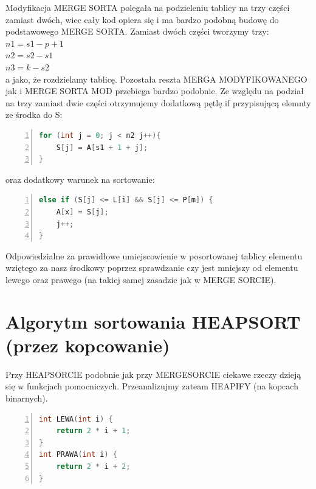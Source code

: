 \documentclass{article}
\begin{document}
\large{Modyfikacja MERGE SORTA polegała na podzieleniu tablicy na trzy części zamiast dwóch, wiec cały kod opiera się i ma bardzo podobną budowę do podstawowego MERGE SORTA. Zamiast dwóch części tworzymy trzy: \\
	 \(n1 = s1 - p + 1\)\\
	 \(n2 = s2 - s1\)\\ 
	 \(n3 = k - s2\)\\
	  a jako, że rozdzielamy tablicę. Pozostała reszta MERGA MODYFIKOWANEGO jak i MERGE SORTA MOD przebiega bardzo podobnie. Ze względu na podział na trzy zamiast dwie części otrzymujemy dodatkową pętlę if przypisującą elemnty ze środka do S:}
\begin{lstlisting}[language=C++, caption={Fragment 2 funkcji sortującej przez scalenie z modyfikacją}, numbers=left, frame=single, xleftmargin=20pt, xrightmargin = 1pt]
for (int j = 0; j < n2 j++){       
	S[j] = A[s1 + 1 + j];
}
\end{lstlisting}

\large {oraz dodatkowy warunek na sortowanie:}

\begin{lstlisting}[language=C++, caption={Fragment 3 funkcji sortującej przez scalenie z modyfikacją}, numbers=left, frame=single, xleftmargin=20pt, xrightmargin = 1pt]
else if (S[j] <= L[i] && S[j] <= P[m]) {  
	A[x] = S[j];                           
	j++;    
}                         
\end{lstlisting}

\large{Odpowiedzialne za prawidłowe umiejscowienie w posortowanej tablicy elementu wziętego za nasz środkowy poprzez sprawdzanie czy jest mniejszy od elementu lewego oraz prawego (na takiej samej zasadzie jak w MERGE SORCIE).}
	\section{Algorytm sortowania HEAPSORT (przez kopcowanie)}


\large{Przy HEAPSORCIE podobnie jak przy MERGESORCIE ciekawe rzeczy dzieją się w funkcjach pomocniczych. Przeanalizujmy zateam HEAPIFY (na kopcach binarnych).}

\begin{lstlisting}[language=C++, caption={Fragment 2 funkcji sortującej przez kopcowanie bez modyfikacji}, numbers=left, frame=single, xleftmargin=20pt, xrightmargin = 1pt]
int LEWA(int i) {
	return 2 * i + 1;
}
int PRAWA(int i) {
	return 2 * i + 2;
}
\end{lstlisting}
\end{document}
